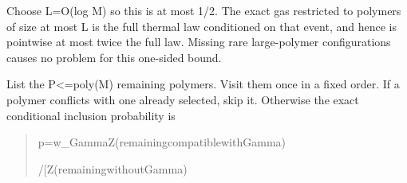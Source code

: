 \documentclass[
]{article}
\begin{document}
Choose L=O(log M) so this is at most 1/2. The exact gas restricted to
polymers of size at most L is the full thermal law conditioned on that
event, and hence is pointwise at most twice the full law. Missing rare
large-polymer configurations causes no problem for this one-sided bound.

List the P\textless=poly(M) remaining polymers. Visit them once in a
fixed order. If a polymer conflicts with one already selected, skip it.
Otherwise the exact conditional inclusion probability is

\begin{quote}\small\ttfamily\raggedright\setlength{\parskip}{0pt}
\noindent p\allowbreak{}\hspace*{0.525em}\allowbreak{}=\allowbreak{}\hspace*{0.525em}\allowbreak{}w\allowbreak{}\_\allowbreak{}G\allowbreak{}a\allowbreak{}m\allowbreak{}m\allowbreak{}a\allowbreak{}\hspace*{0.525em}\allowbreak{}Z\allowbreak{}(\allowbreak{}r\allowbreak{}e\allowbreak{}m\allowbreak{}a\allowbreak{}i\allowbreak{}n\allowbreak{}i\allowbreak{}n\allowbreak{}g\allowbreak{}\hspace*{0.525em}\allowbreak{}c\allowbreak{}o\allowbreak{}m\allowbreak{}p\allowbreak{}a\allowbreak{}t\allowbreak{}i\allowbreak{}b\allowbreak{}l\allowbreak{}e\allowbreak{}\hspace*{0.525em}\allowbreak{}w\allowbreak{}i\allowbreak{}t\allowbreak{}h\allowbreak{}\hspace*{0.525em}\allowbreak{}G\allowbreak{}a\allowbreak{}m\allowbreak{}m\allowbreak{}a\allowbreak{})\par
\noindent \hspace*{0.525em}\allowbreak{}\hspace*{0.525em}\allowbreak{}\hspace*{0.525em}\allowbreak{}\hspace*{0.525em}\allowbreak{}/\allowbreak{}\hspace*{0.525em}\allowbreak{}[\allowbreak{}Z\allowbreak{}(\allowbreak{}r\allowbreak{}e\allowbreak{}m\allowbreak{}a\allowbreak{}i\allowbreak{}n\allowbreak{}i\allowbreak{}n\allowbreak{}g\allowbreak{}\hspace*{0.525em}\allowbreak{}w\allowbreak{}i\allowbreak{}t\allowbreak{}h\allowbreak{}o\allowbreak{}u\allowbreak{}t\allowbreak{}\hspace*{0.525em}\allowbreak{}G\allowbreak{}a\allowbreak{}m\allowbreak{}m\allowbreak{}a\allowbreak{})\par

\end{quote}
\end{document}
